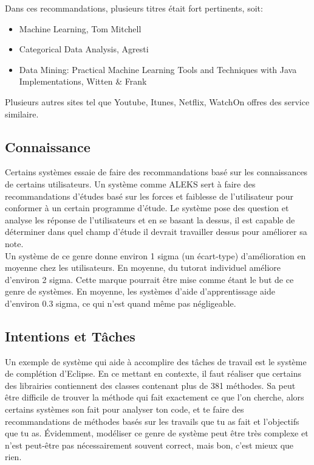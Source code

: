 \documentclass[oneside]{book}
\begin{document}
Dans ces recommandations, plusieurs titres était fort pertinents, soit:\\
\begin{itemize}
\item Machine Learning, Tom Mitchell
\item Categorical Data Analysis, Agresti
\item Data Mining: Practical Machine Learning Tools and Techniques with Java Implementations, Witten \& Frank
\end{itemize}

Plusieurs autres sites tel que Youtube, Itunes, Netflix, WatchOn offres des service similaire.

\subsection{Connaissance}
Certains systèmes essaie de faire des recommandations basé sur les connaissances de certains utilisateurs. Un système comme ALEKS sert à faire des recommandations d'études basé sur les forces et faiblesse de l'utilisateur pour conformer à un certain programme d'étude. Le système pose des question et analyse les réponse de l'utilisateurs et en se basant la dessus, il est capable de déterminer dans quel champ d'étude il devrait travailler dessus pour améliorer sa note.\\

Un système de ce genre donne environ 1 sigma (un écart-type) d'amélioration en moyenne chez les utilisateurs. En moyenne, du tutorat individuel améliore d'environ 2 sigma. Cette marque pourrait être mise comme étant le but de ce genre de systèmes. En moyenne, les systèmes d'aide d'apprentissage aide d'environ 0.3 sigma, ce qui n'est quand même pas négligeable.
\subsection{Intentions et Tâches}
Un exemple de système qui aide à accomplire des tâches de travail est le système de complétion d'Eclipse. En ce mettant en contexte, il faut réaliser que certains des librairies contiennent des classes contenant plus de 381 méthodes. Sa peut être difficile de trouver la méthode qui fait exactement ce que l'on cherche, alors certains systèmes son fait pour analyser ton code, et te faire des recommandations de méthodes basés sur les travails que tu as fait et l'objectifs que tu as. Évidemment, modéliser ce genre de système peut être très complexe et n'est peut-être pas nécessairement souvent correct, mais bon, c'est mieux que rien.\\
\end{document}
